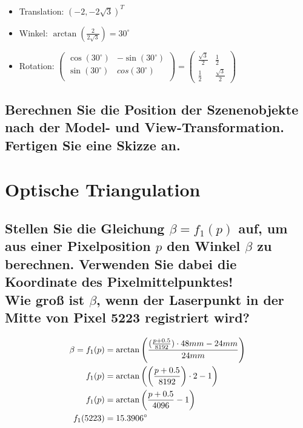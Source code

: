 \documentclass[a4paper,10pt,DIV=14]{scrartcl}
\newcommand{\dg}[1]{#1^\circ}
\begin{document}
\begin{itemize}
	\item Translation: $ \left(-2, -2\sqrt{3}\right)^T $
	\item Winkel: $ \arctan\left(\frac{2}{2\sqrt{3}}\right) = \dg{30} $
	\item Rotation: $ \begin{pmatrix}	\cos(\dg{30}) & -\sin(\dg{30}) \\ \sin(\dg{30}) & cos(\dg{30}) \\ \end{pmatrix}
	= \begin{pmatrix} \frac{\sqrt{3}}{2} & \frac{1}{2} \\ \frac{1}{2} & \frac{\sqrt{3}}{2} \end{pmatrix} $
\end{itemize}


\subsection{Berechnen Sie die Position der Szenenobjekte nach der Model- und View-Trans\-for\-ma\-tion. Fertigen Sie eine Skizze an.}



\section{Optische Triangulation}

\subsection{Stellen Sie die Gleichung $\beta = f_1(p)$ auf, um aus einer Pixelposition $p$ den Winkel $\beta$ zu berechnen. Verwenden Sie dabei die Koordinate des Pixelmittelpunktes! \\ Wie groß ist $\beta$, wenn der Laserpunkt in der Mitte von Pixel 5223 registriert wird?}
%
%
%
\begin{align*}
\beta = f_1(p) &= \arctan \left( \frac{(\frac{p+0.5}{8192}) \cdot 48mm - 24mm}{24 mm} \right) \\
f_1(p) &= \arctan \left(\left(\frac{p+0.5}{8192}\right) \cdot 2 - 1 \right) \\
f_1(p) &= \arctan \left(\frac{p+0.5}{4096} - 1 \right) \\
f_1(5223) &=  15.3906 \degree
\end{align*}
\end{document}
